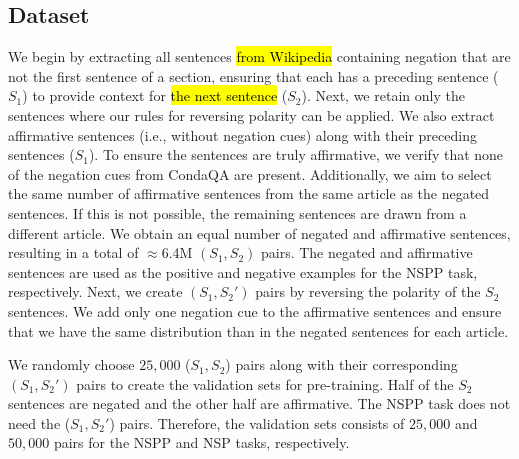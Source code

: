 \subsection{Dataset}
\label{sec:dataset}

We begin by extracting all sentences \hl{from Wikipedia} containing negation that are not the first sentence of a section, 
ensuring that each has a preceding sentence ($S_1$) to provide context for \hl{the next sentence} ($S_2$).
Next, we retain only the sentences where our rules for reversing polarity can be applied.
We also extract affirmative sentences (i.e., without negation cues) along with their preceding sentences ($S_1$).
To ensure the sentences are truly affirmative, we verify that none of the negation cues from CondaQA are present.
Additionally, 
we aim to select the same number of affirmative sentences from the same article as the negated sentences.
If this is not possible, the remaining sentences are drawn from a different article.
We obtain an equal number of negated and affirmative sentences, resulting in a total of $\approx$6.4M $(S_1, S_2)$ pairs. 
The negated and affirmative sentences are used as the positive and negative examples for the NSPP task, respectively.
Next, we create $(S_1, S_2')$ pairs by reversing the polarity of the $S_2$ sentences.
We add only one negation cue to the affirmative sentences
and ensure that we have the same distribution than in the negated sentences for each article.


We randomly choose $25,000$ ($S_1, S_2$) pairs along with their corresponding $(S_1, S_2')$ pairs to create the validation sets for pre-training.
Half of the $S_2$ sentences are negated and the other half are affirmative.
The NSPP task does not need the ($S_1, S_2'$) pairs.
Therefore, the validation sets consists of $25,000$ and $50,000$ pairs for the NSPP and NSP tasks, respectively.